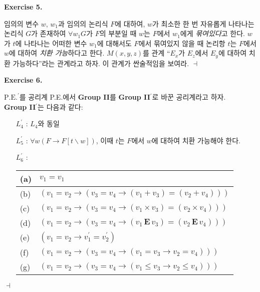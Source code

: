 \documentclass[12pt]{paper}
\newenvironment{context}[1][]
{ \noindent \textbf{{#1}.}
}
{ \hfill $ \dashv $ }
\begin{document}
\begin{context}[Exercise 5]
임의의 변수 $w$, $w_1$과 임의의 논리식 $F$에 대하여,
$w$가 최소한 한 번 자유롭게 나타나는 논리식 $G$가 존재하여
$\forall w_1 G$가 $F$의 부분일 때
$w$는 $F$에서 $w_1$에게 \textit{묶여있다}고 한다.
$w$가 $t$에 나타나는 어떠한 변수 $w_1$에 대해서도 $F$에서 묶여있지 않을 때
논리항 $t$는 $F$에서 $w$에 대하여 \textit{치환 가능}하다고 한다.
$M \left( x , y , z \right)$를 관계 ``$E_x$가 $E_z$에서 $E_y$에 대하여 치환 가능하다''라는 관계라고 하자.
이 관계가 싼술적임을 보여라.
\end{context}

\begin{context}[Exercise 6]
$\mathrm{P.E.}^{\prime}$를 공리계 P.E.에서 \textbf{Group II}를 \textbf{Group II}$^{\prime}$로 바꾼 공리계라고 하자. \\
\textbf{Group II}$^{\prime}$는 다음과 같다:
\begin{enumerate}
\item [$L_4^{\prime}$]: $L_4$와 동일
\item [$L_5^{\prime}$]: $\forall w \left( F \rightarrow F \left[ t \backslash w \right] \right)$,
이때 $t$는 $F$에서 $w$에 대하여 치환 가능해야 한다.
\item [$L_6^{\prime}$]:
\begin{tabular}{|l|l|} \hline
(a) & $ v_1 = v_1 $ \\ \hline
(b) & $ \left( v_1 = v_2 \rightarrow \left( v_3 = v_4 \rightarrow \left( v_1 + v_3 \right) = \left( v_2 + v_4 \right) \right) \right)$ \\ \hline
(c) & $ \left( v_1 = v_2 \rightarrow \left( v_3 = v_4 \rightarrow \left( v_1 \times v_3 \right) = \left( v_2 \times v_4 \right) \right) \right)$ \\ \hline
(d) & $ \left( v_1 = v_2 \rightarrow \left( v_3 = v_4 \rightarrow \left( v_1 \, \mathbf{E} \, v_3 \right) = \left( v_2 \, \mathbf{E} \, v_4 \right) \right) \right)$ \\ \hline
(e) & $ \left( v_1 = v_2 \rightarrow v_1^{\prime} = v_2^{\prime} \right) $ \\ \hline
(f) & $ \left( v_1 = v_2 \rightarrow \left( v_3 = v_4 \rightarrow \left( v_1 = v_3 \rightarrow v_2 = v_4 \right) \right) \right) $ \\ \hline
(g) & $ \left( v_1 = v_2 \rightarrow \left( v_3 = v_4 \rightarrow \left( v_1 \le v_3 \rightarrow v_2 \le v_4 \right) \right) \right) $ \\ \hline
\end{tabular}
\end{enumerate}


\end{context}
\end{document}
